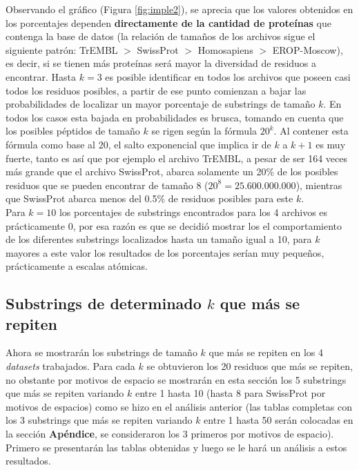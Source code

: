 Observando el gráfico (Figura \ref{fig:imple2}), se aprecia que los valores obtenidos en los porcentajes dependen \textbf{directamente de la cantidad de proteínas} que contenga la base de datos (la relación de tamaños de los archivos sigue el siguiente patrón: TrEMBL $>$ SwissProt $>$ Homosapiens $>$ EROP-Moscow), es decir, si se tienen más proteínas será mayor la diversidad de residuos a encontrar. Hasta $k=3$ es posible identificar en todos los archivos que poseen casi todos los residuos posibles, a partir de ese punto comienzan a bajar las probabilidades de localizar un mayor porcentaje de substrings de tamaño $k$. En todos los casos esta bajada en probabilidades es brusca, tomando en cuenta que los posibles péptidos de tamaño $k$ se rigen según la fórmula $20^{k}$. Al contener esta fórmula como base al 20, el salto exponencial que implica ir de $k$ a $k+1$ es muy fuerte, tanto es así que por ejemplo el archivo TrEMBL, a pesar de ser 164 veces más grande que el archivo SwissProt, abarca solamente un 20\% de los posibles residuos que se pueden encontrar de tamaño 8 ($20^{8} = 25.600.000.000$), mientras que SwissProt abarca menos del 0.5\% de residuos posibles para este $k$.\\
Para $k=10$ los porcentajes de substrings encontrados para los 4 archivos es prácticamente 0, por esa razón es que se decidió mostrar los el comportamiento de los diferentes substrings localizados hasta un tamaño igual a 10, para $k$ mayores a este valor los resultados de los porcentajes serían muy pequeños, prácticamente a escalas atómicas. 

\subsection{Substrings de determinado $k$ que más se repiten}

Ahora se mostrarán los substrings de tamaño $k$ que más se repiten en los 4 \textit{datasets} trabajados. Para cada $k$ se obtuvieron los 20 residuos que más se repiten, no obstante por motivos de espacio se mostrarán en esta sección los 5 substrings que más se repiten variando $k$ entre 1 hasta 10 (hasta 8 para SwissProt por motivos de espacios) como se hizo en el análisis anterior (las tablas completas con los 3 substrings que más se repiten variando $k$ entre 1 hasta 50 serán colocadas en la sección \textbf{Apéndice}, se consideraron los 3 primeros por motivos de espacio). Primero se presentarán las tablas obtenidas y luego se le hará un análisis a estos resultados.

